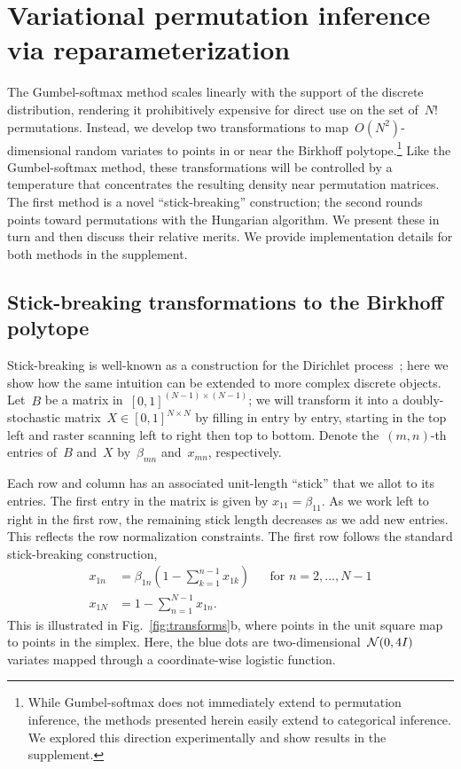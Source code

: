 \documentclass[twoside]{article}
\begin{document}
\section{Variational permutation inference via reparameterization}
\label{sec:permutation}
The Gumbel-softmax method scales linearly with the support of the
discrete distribution, rendering it prohibitively expensive for direct
use on the set of~$N!$ permutations.  Instead, we develop two
transformations to map~$O(N^2)$-dimensional random variates to points
in or near the Birkhoff polytope.\footnote{While Gumbel-softmax does
  not immediately extend to permutation inference, the methods
  presented herein easily extend to categorical inference.  We
  explored this direction experimentally and show results in the
  supplement.}  Like the Gumbel-softmax method, these transformations
will be controlled by a temperature that concentrates the resulting
density near permutation matrices.  The first method is a novel
``stick-breaking'' construction; the second rounds points toward
permutations with the Hungarian algorithm.  We present these in turn
and then discuss their relative merits. We provide 
implementation details for both methods in the supplement.

\subsection{Stick-breaking transformations to the Birkhoff polytope}
\label{sub:stickbreaking}

Stick-breaking is well-known as a construction for the Dirichlet
process~\citep{sethuraman1994constructive}; here we show how the
same intuition can be extended to more complex discrete objects. 
Let~$B$ be a matrix in~${[0,1]^{(N-1) \times (N-1)}}$; we will
transform it into a doubly-stochastic
matrix~${X \in [0,1]^{N \times N}}$ by filling in entry by entry, starting
in the top left and raster scanning left to right then top to
bottom. Denote the~$(m,n)$-th entries of~$B$ and~$X$ by~$\beta_{mn}$
and~${x}_{mn}$, respectively.

Each row and column has an associated unit-length ``stick'' that we
allot to its entries.  The first entry in the matrix is given by
$x_{11} = \beta_{11}$.  As we work left to right in the first row, the
remaining stick length decreases as we add new entries. This reflects
the row normalization constraints.  The first row follows the standard
stick-breaking construction,
\begin{align*}
  x_{1n} &= \beta_{1n} \left(1 - \sum_{k=1}^{n-1} x_{1k} \right)  & &  \text{for } n=2, \ldots, N-1\\
  x_{1N} &= 1 - \sum_{n=1}^{N-1} x_{1n}.
\end{align*}
This is illustrated in Fig.~\ref{fig:transforms}b, where points in the
unit square map to points in the simplex. Here, the blue dots are
two-dimensional~$\mathcal{N}(0, 4I)$ variates mapped through a
coordinate-wise logistic function.
\end{document}
